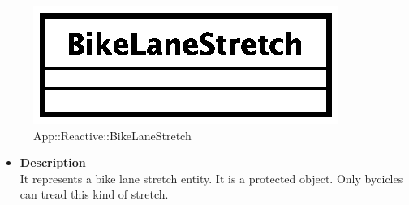 \begin{figure}[h]
\centering
\includegraphics[scale=0.6,keepaspectratio]{images/solution/bikelane_stretch.eps}
\caption{App::Reactive::BikeLaneStretch}
\label{fig:sd-app-bikelane_stretch}
\end{figure}
\FloatBarrier
\begin{itemize}
  \item \textbf{Description} \\
    It represents a bike lane stretch entity. It is a protected object. Only bycicles 
can tread this kind of stretch.
\end{itemize}
